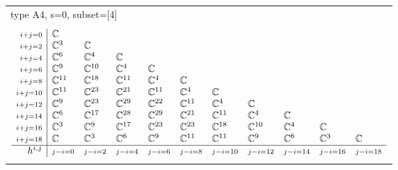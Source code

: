 \documentclass[crop,border=2mm]{standalone}
\begin{document}
\begin{tabular}{l}
{\huge type A4, s=0, subset=[4]}\\ \\


$\displaystyle
\begin{array}{r|l l l l l l l l l l}
	{\scriptstyle i+j=0}&\mathbb{C}&&&&&&&&&\\
	{\scriptstyle i+j=2}&\mathbb{C}^{3}&\mathbb{C}&&&&&&&&\\
	{\scriptstyle i+j=4}&\mathbb{C}^{6}&\mathbb{C}^{4}&\mathbb{C}&&&&&&&\\
	{\scriptstyle i+j=6}&\mathbb{C}^{9}&\mathbb{C}^{10}&\mathbb{C}^{4}&\mathbb{C}&&&&&&\\
	{\scriptstyle i+j=8}&\mathbb{C}^{11}&\mathbb{C}^{18}&\mathbb{C}^{11}&\mathbb{C}^{4}&\mathbb{C}&&&&&\\
	{\scriptstyle i+j=10}&\mathbb{C}^{11}&\mathbb{C}^{23}&\mathbb{C}^{21}&\mathbb{C}^{11}&\mathbb{C}^{4}&\mathbb{C}&&&&\\
	{\scriptstyle i+j=12}&\mathbb{C}^{9}&\mathbb{C}^{23}&\mathbb{C}^{29}&\mathbb{C}^{22}&\mathbb{C}^{11}&\mathbb{C}^{4}&\mathbb{C}&&&\\
	{\scriptstyle i+j=14}&\mathbb{C}^{6}&\mathbb{C}^{17}&\mathbb{C}^{28}&\mathbb{C}^{29}&\mathbb{C}^{21}&\mathbb{C}^{11}&\mathbb{C}^{4}&\mathbb{C}&&\\
	{\scriptstyle i+j=16}&\mathbb{C}^{3}&\mathbb{C}^{9}&\mathbb{C}^{17}&\mathbb{C}^{23}&\mathbb{C}^{23}&\mathbb{C}^{18}&\mathbb{C}^{10}&\mathbb{C}^{4}&\mathbb{C}&\\
	{\scriptstyle i+j=18}&\mathbb{C}&\mathbb{C}^{3}&\mathbb{C}^{6}&\mathbb{C}^{9}&\mathbb{C}^{11}&\mathbb{C}^{11}&\mathbb{C}^{9}&\mathbb{C}^{6}&\mathbb{C}^{3}&\mathbb{C}\\
	\hline h^{i,j}&{\scriptstyle j-i=0}&{\scriptstyle j-i=2}&{\scriptstyle j-i=4}&{\scriptstyle j-i=6}&{\scriptstyle j-i=8}&{\scriptstyle j-i=10}&{\scriptstyle j-i=12}&{\scriptstyle j-i=14}&{\scriptstyle j-i=16}&{\scriptstyle j-i=18}
\end{array}
$ \\ \\



\end{tabular}
\end{document}
